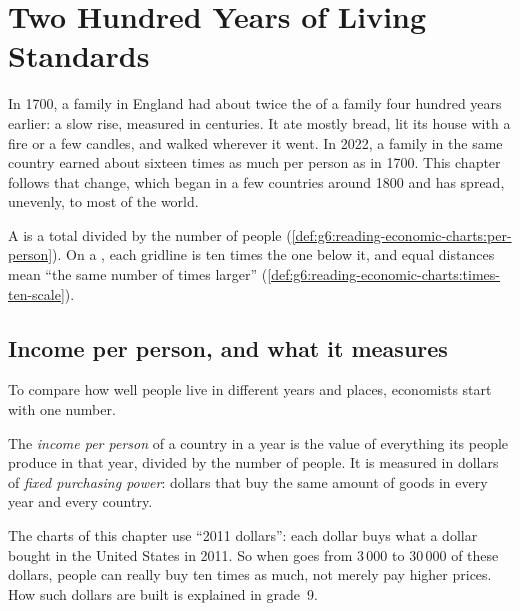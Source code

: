 \chapter{Two Hundred Years of Living Standards}\label{ch:g6:living-standards}

In 1700, a family in England had about twice the  of a family
four hundred years earlier: a slow rise, measured in centuries. It ate mostly bread, lit its house with a
fire or a few candles, and walked wherever it went. In 2022, a family in the
same country earned about sixteen times as much per person as in 1700. This
chapter follows that change, which began in a few countries around 1800 and
has spread, unevenly, to most of the world.

\begin{recall}
A  is a total divided by the number of people
(\cref{def:g6:reading-economic-charts:per-person}). On a , each
gridline is ten times the one below it, and equal distances mean ``the same
number of times larger'' (\cref{def:g6:reading-economic-charts:times-ten-scale}).
\end{recall}

\section{Income per person, and what it measures}

To compare how well people live in different years and places, economists
start with one number.

\begin{definition}\label{def:g6:living-standards:income-per-person}
The \emph{income per person} of a country in a year
is the value of everything its people produce in that year, divided by the
number of people. It is measured in dollars of \emph{fixed purchasing power}:
dollars that buy the same amount of goods in every year and every country.
\end{definition}

The charts of this chapter use ``2011 dollars'': each dollar buys what a
dollar bought in the United States in 2011. So when  goes
from 3\,000 to 30\,000 of these dollars, people can really buy ten times as
much, not merely pay higher prices. How such dollars are built is explained in
grade~9.

